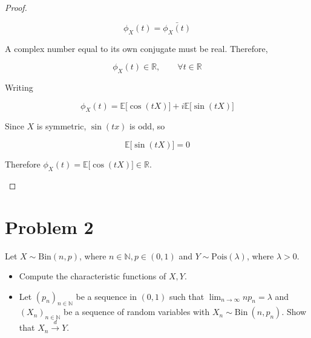 \documentclass{qlnotes-export}
\begin{document}
\begin{proof}
\begin{itemize}
  \[\phi_{X}(t) = \bar{\phi_{X}(t)}\]

  A complex number equal to its own conjugate must be real. Therefore,

  \[\phi_{X}(t) \in {\mathbb{R}},\qquad\forall t \in {\mathbb{R}}\]

  Writing

  \[\phi_{X}(t) = {\mathbb{E}}\lbrack\cos(tX)\rbrack + i{\mathbb{E}}\lbrack\sin(tX)\rbrack\]

  Since \(X\) is symmetric, \(\sin(tx)\) is odd, so

  \[{\mathbb{E}}\lbrack\sin(tX)\rbrack = 0\]

  Therefore \(\phi_{X}(t) = {\mathbb{E}}\lbrack\cos(tX)\rbrack \in {\mathbb{R}}\).
\end{itemize}

\end{proof}

\section{Problem 2}\label{problem-2-6}

Let \(X \sim \text{Bin}(n,p)\), where \(n \in {\mathbb{N}},p \in (0,1)\) and \(Y \sim \text{Pois}(\lambda)\), where \(\lambda > 0\).

\begin{itemize}
\item
  Compute the characteristic functions of \(X,Y\).
\item
  Let \(\left( p_{n} \right)_{n \in {\mathbb{N}}}\) be a sequence in \((0,1)\) such that \(\lim_{n\rightarrow\infty}np_{n} = \lambda\) and \(\left( X_{n} \right)_{n \in {\mathbb{N}}}\) be a sequence of random variables with \(X_{n} \sim \text{Bin}\ \left( {n,p_{n}} \right)\). Show that \(X_{n}\overset{d}{\rightarrow}Y\).
\end{itemize}
\end{document}
